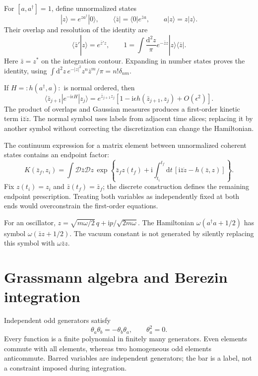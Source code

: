 \documentclass[11pt]{article}
\newcommand{\dd}{\mathrm d}
\newcommand{\ii}{\mathrm i}
\newcommand{\D}{\mathcal D}
\newcommand{\module}[1]{\clearpage\section{#1}}
\begin{document}
For \([a,a^\dagger]=1\), define unnormalized states
\begin{equation}
 |z\rangle=e^{za^\dagger}|0\rangle,\qquad
 \langle\bar z|=\langle0|e^{\bar za},\qquad
 a|z\rangle=z|z\rangle.
\end{equation}
Their overlap and resolution of the identity are
\begin{equation}
 \langle\bar z'|z\rangle=e^{\bar z'z},\qquad
 1=\int\frac{\dd^2z}{\pi}e^{-\bar zz}|z\rangle\langle\bar z|.
                                                        \label{eq:bosonidentity}
\end{equation}
Here \(\bar z=z^*\) on the integration contour. Expanding in number
states proves the identity, using
\(\int\dd^2z\,e^{-|z|^2}z^n\bar z^m/\pi=n!\delta_{nm}\).

If \(H=:h(a^\dagger,a):\) is normal ordered, then
\begin{equation}
 \langle\bar z_{j+1}|e^{-\ii\epsilon H}|z_j\rangle
 =e^{\bar z_{j+1}z_j}
 [1-\ii\epsilon h(\bar z_{j+1},z_j)+O(\epsilon^2)].
\end{equation}
The product of overlaps and Gaussian measures produces a first-order
kinetic term \(\ii\bar z\dot z\). The normal symbol uses labels from
adjacent time slices; replacing it by another symbol without correcting
the discretization can change the Hamiltonian.

The continuum expression for a matrix element between unnormalized
coherent states contains an endpoint factor:
\begin{equation}
 K(\bar z_f,z_i)=\int\D\bar z\D z\,
 \exp\!\left\{\bar z_fz(t_f)+\ii\int_{t_i}^{t_f}\dd t\,
 [\ii\bar z\dot z-h(\bar z,z)]\right\}.             \label{eq:bosonpath}
\end{equation}
Fix \(z(t_i)=z_i\) and \(\bar z(t_f)=\bar z_f\); the discrete
construction defines the remaining endpoint prescription. Treating
both variables as independently fixed at both ends would overconstrain
the first-order equations.

For an oscillator, \(z=\sqrt{m\omega/2}\,q+\ii p/\sqrt{2m\omega}\).
The Hamiltonian \(\omega(a^\dagger a+1/2)\) has symbol
\(\omega(\bar zz+1/2)\). The vacuum constant is not generated by
silently replacing this symbol with \(\omega\bar zz\).

\module{Grassmann algebra and Berezin integration}
Independent odd generators satisfy
\begin{equation}
 \theta_a\theta_b=-\theta_b\theta_a,\qquad \theta_a^2=0.
\end{equation}
Every function is a finite polynomial in finitely many generators.
Even elements commute with all elements, whereas two homogeneous odd
elements anticommute. Barred variables are independent generators;
the bar is a label, not a constraint imposed during integration.
\end{document}
